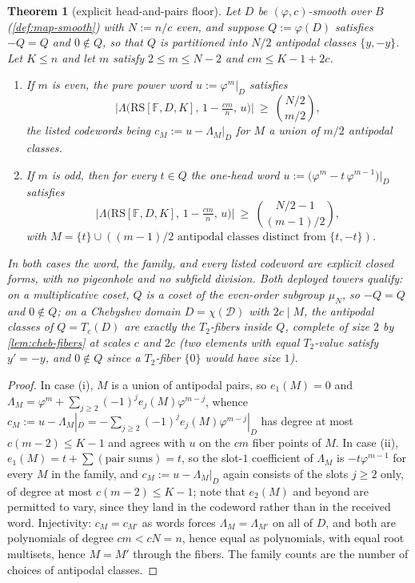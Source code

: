 \documentclass[11pt]{article}
\newtheorem{theorem}{Theorem}[section]
\theoremstyle{definition}
\theoremstyle{remark}
\newcommand{\F}{\mathbb{F}}
\newcommand{\B}{B}
\newcommand{\RS}{\mathrm{RS}}
\newcommand{\Lst}{\Lambda}
\begin{document}
\begin{theorem}[explicit head-and-pairs floor]\label{thm:explicit-head-floor}
Let $D$ be $(\varphi,c)$-smooth over $\B$ \textup(\cref{def:map-smooth}\textup) with $N:=n/c$ even, and suppose $Q:=\varphi(D)$ satisfies $-Q=Q$ and $0\notin Q$, so that $Q$ is partitioned into $N/2$ antipodal classes $\{y,-y\}$. Let $K\le n$ and let $m$ satisfy $2\le m\le N-2$ and $cm\le K-1+2c$.
\begin{enumerate}[label=\textup{(\roman*)}]
\item If $m$ is even, the \emph{pure power word} $u:=\varphi^m|_D$ satisfies
\[
\bigl|\Lst\bigl(\RS[\F,D,K],\,1-\tfrac{cm}n,\,u\bigr)\bigr|\ \ge\ \binom{N/2}{m/2},
\]
the listed codewords being $c_M:=u-\Lambda_M|_D$ for $M$ a union of $m/2$ antipodal classes.
\item If $m$ is odd, then for every $t\in Q$ the \emph{one-head word} $u:=\bigl(\varphi^m-t\,\varphi^{m-1}\bigr)|_D$ satisfies
\[
\bigl|\Lst\bigl(\RS[\F,D,K],\,1-\tfrac{cm}n,\,u\bigr)\bigr|\ \ge\ \binom{N/2-1}{(m-1)/2},
\]
with $M=\{t\}\cup(\text{$(m-1)/2$ antipodal classes distinct from $\{t,-t\}$})$.
\end{enumerate}
In both cases the word, the family, and every listed codeword are explicit closed forms, with no pigeonhole and no subfield division. Both deployed towers qualify: on a multiplicative coset, $Q$ is a coset of the even-order subgroup $\mu_N$, so $-Q=Q$ and $0\notin Q$; on a Chebyshev domain $D=\chi(\mathcal D)$ with $2c\mid M$, the antipodal classes of $Q=T_c(D)$ are exactly the $T_2$-fibers inside $Q$, complete of size $2$ by \cref{lem:cheb-fibers} at scales $c$ and $2c$ \textup(two elements with equal $T_2$-value satisfy $y'=-y$, and $0\notin Q$ since a $T_2$-fiber $\{0\}$ would have size $1$\textup).
\end{theorem}

\begin{proof}
In case \textup{(i)}, $M$ is a union of antipodal pairs, so $e_1(M)=0$ and $\Lambda_M=\varphi^m+\sum_{j\ge2}(-1)^je_j(M)\varphi^{m-j}$, whence $c_M:=u-\Lambda_M|_D=-\sum_{j\ge2}(-1)^je_j(M)\varphi^{m-j}|_D$ has degree at most $c(m-2)\le K-1$ and agrees with $u$ on the $cm$ fiber points of $M$. In case \textup{(ii)}, $e_1(M)=t+\sum(\text{pair sums})=t$, so the slot-$1$ coefficient of $\Lambda_M$ is $-t\varphi^{m-1}$ for every $M$ in the family, and $c_M:=u-\Lambda_M|_D$ again consists of the slots $j\ge2$ only, of degree at most $c(m-2)\le K-1$; note that $e_2(M)$ and beyond are permitted to vary, since they land in the codeword rather than in the received word. Injectivity: $c_M=c_{M'}$ as words forces $\Lambda_M=\Lambda_{M'}$ on all of $D$, and both are polynomials of degree $cm<cN=n$, hence equal as polynomials, with equal root multisets, hence $M=M'$ through the fibers. The family counts are the number of choices of antipodal classes.
\end{proof}
\end{document}
